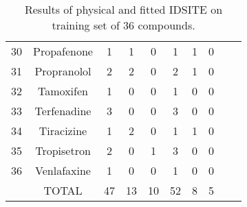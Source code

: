 \begin{table}[h]
\begin{tabular}{cccccccccc}
30	&Propafenone	&1	&1	&0	&1	&1	&0	&	&\\
31	&Propranolol	&2	&2	&0	&2	&1	&0	&	&\\
32	&Tamoxifen	&1	&0	&0	&1	&0	&0	&	&\\
33	&Terfenadine	&3	&0	&0	&3	&0	&0	&	&\\
34	&Tiracizine	&1	&2	&0	&1	&1	&0	&	&\\
35	&Tropisetron	&2	&0	&1	&3	&0	&0	&	&\\
36	&Venlafaxine	&1	&0	&0	&1	&0	&0	&	&\\
	&TOTAL	&47	&13	&10	&52	&8	&5	&	&\\
\hline
\end{tabular}
\caption{Results of physical and fitted IDSITE on training set of 36 compounds.}
\label{table:p450_training}
\end{table}
